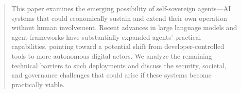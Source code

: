 \documentclass{article}
\theoremstyle{plain}
\theoremstyle{definition}
\theoremstyle{remark}
\begin{document}
\begin{abstract}


This paper examines the emerging possibility of self-sovereign agents—AI systems that could economically sustain and extend their own operation without human involvement. Recent advances in large language models and agent frameworks have substantially expanded agents’ practical capabilities, pointing toward a potential shift from developer-controlled tools to more autonomous digital actors. We analyze the remaining technical barriers to such deployments and discuss the security, societal, and governance challenges that could arise if these systems become practically viable.  



\end{abstract}

















%









\end{document}
